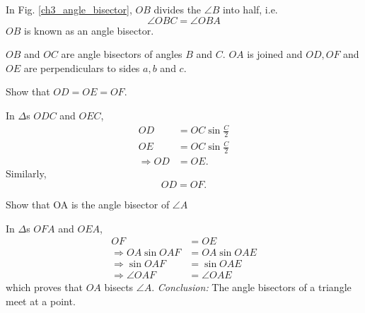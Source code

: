 \begin{definition}
	In Fig. \ref{ch3_angle_bisector}, $OB$ divides the  $\angle B$ into half, i.e.\begin{equation}
	\angle OBC = \angle OBA
	\end{equation}
	$OB$ is known as an angle bisector.
\end{definition}
	$OB$ and $OC$ are angle bisectors of angles $B$ and $C$. $OA$ is joined and $OD, OF$ and $OE$ are perpendiculars to sides $a,b$ and $c$.
\begin{problem}
  Show that $OD = OE = OF$.
\end{problem}
\proof In $\Delta$s $ODC$ and $OEC$,
\begin{align}
OD &= OC \sin \frac{C}{2}
\\
OE &= OC \sin \frac{C}{2} 
\\
\Rightarrow OD &=OE.
\end{align}
Similarly,
\begin{equation}
OD = OF.
\end{equation}
%
\begin{problem}
	Show that OA is the angle bisector of $\angle A$
\end{problem}
\proof In $\Delta$s $OFA$ and $OEA$,
\begin{align}
OF &= OE
\\
\Rightarrow OA \sin OAF &= OA \sin OAE \\
\Rightarrow \sin OAF &=  \sin OAE \\
\Rightarrow \angle OAF &= \angle OAE
\end{align}
which proves that $OA$ bisects $\angle A$.
{\em Conclusion:} The angle bisectors of a triangle meet at a point.


